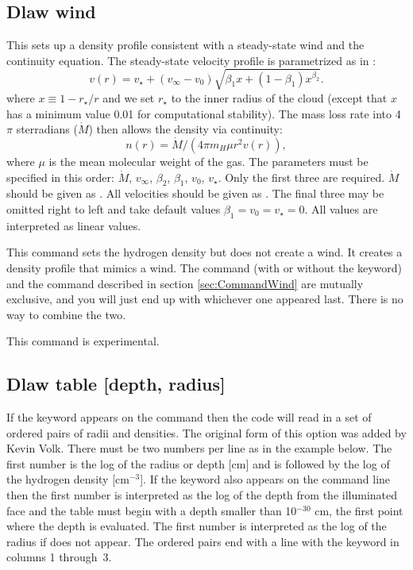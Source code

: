 \begin{shaded}
\subsection{\experimental Dlaw wind}

This sets up a density profile consistent with a steady-state wind
and the continuity equation. The steady-state velocity profile is 
parametrized as in \citet{Springmann1994}:
\begin{equation}
v(r) = v_\star + (v_{\infty} - v_0) \sqrt{ \beta_1 x + (1-\beta_1) x^{\beta_2} }.
\end{equation}
where $x\equiv 1 - r_\star/r$ and we set $r_\star$ to the inner radius of the
cloud (except that $x$ has a minimum value 0.01 for
computational stability).
The mass loss rate into 4$\pi$ sterradians ($\dot{M}$) then allows
the density via continuity:
\begin{equation}
n(r) = \dot{M} / ( 4\pi m_H \mu r^2 v(r) ),
\end{equation}
where $\mu$ is the mean molecular weight of the gas.
The parameters must be specified in this order:
$\dot{M}$, $v_{\infty}$, $\beta_2$, $\beta_1$, $v_0$, $v_\star$.
Only the first three are required.  
$\dot{M}$ should be given as \Msunpyr.
All velocities should be given as \kmps.
The final three may be omitted right to left and
take default values $\beta_1 = v_0 = v_\star = 0$.
All values are interpreted as linear values.

This command sets the hydrogen density but does not create a wind.  
It creates a density profile that mimics a wind.  
The   command 
(with or without the   keyword) 
and the   command described in section 
\ref{sec:CommandWind} are mutually exclusive, 
and you will just end up with whichever one appeared last.  
There is no way to combine the two.

This command is experimental.
\end{shaded}

\subsection{Dlaw table [depth, radius]}

If the keyword  appears on the 
command then the code will read
in a set of ordered pairs of radii and densities.
The original form of
this option was added by Kevin Volk.
There must be two numbers per line
as in the example below.
The first number is the log of the radius or depth
[cm] and is followed by the log of the hydrogen density [cm$^{-3}$].
If the
keyword  also appears on the command line then
the first number is
interpreted as the log of the depth from the illuminated face
and the table
must begin with a depth smaller than 10$^{-30}$ cm,
the first point where the
depth is evaluated.
The first number is interpreted as the log of the radius
if  does not appear.
The ordered pairs end with a line with the keyword
 in columns 1 through~3.


